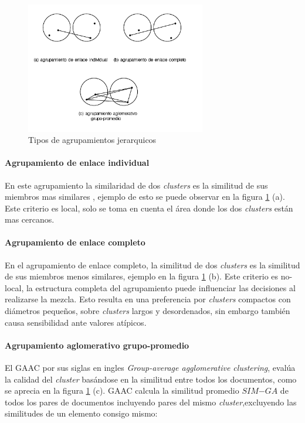  \begin{figure}[!htbp]
        \centering
        \includegraphics[width=0.7\textwidth]{Figuras/h_clust1.png}
        \caption{Tipos de agrupamientos jerarquicos}
        \label{fig:hclust}
\end{figure}

\paragraph{Agrupamiento de enlace individual}
  En este agrupamiento la similaridad de dos \textit{clusters} es la similitud de sus miembros mas similares , ejemplo de esto se puede observar en la figura \ref{fig:hclust} (a). Este criterio es local, solo se toma en cuenta el área donde los dos \textit{clusters} están mas cercanos.\cite{informationretrieval}


\paragraph{Agrupamiento de enlace completo}

En el agrupamiento de enlace completo, la similitud de dos \textit{clusters} es la similitud de sus miembros menos similares, ejemplo en la figura \ref{fig:hclust} (b). Este criterio es no-local, la estructura completa del agrupamiento puede influenciar las decisiones al realizarse la mezcla. Esto resulta en una preferencia por \textit{clusters} compactos con diámetros pequeños, sobre \textit{clusters} largos y desordenados, sin embargo también causa sensibilidad ante valores atípicos.\cite{informationretrieval}

\paragraph{Agrupamiento aglomerativo grupo-promedio}
  El GAAC por sus siglas en ingles \textit{Group-average agglomerative clustering}, evalúa la calidad del \textit{cluster} basándose en la similitud entre todos los documentos, como se aprecia en la figura \ref{fig:hclust} (c). GAAC calcula la similitud promedio $SIM\mathrm{-}GA$ de todos los pares de documentos incluyendo pares del mismo \textit{cluster},excluyendo las similitudes de un elemento consigo mismo:

